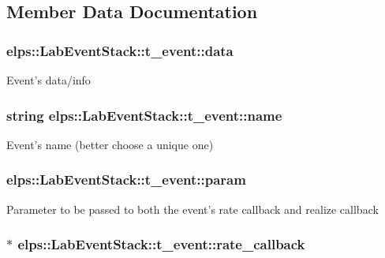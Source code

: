 \subsection{Member Data Documentation}
\hypertarget{structelps_1_1_lab_event_stack_1_1t__event_a1044f494c01f5ea07e218b3e864d7d01}{
\subsubsection[{data}]{ elps\+::\+Lab\+Event\+Stack\+::t\+\_\+event\+::data}}\label{structelps_1_1_lab_event_stack_1_1t__event_a1044f494c01f5ea07e218b3e864d7d01}
Event's data/info \hypertarget{structelps_1_1_lab_event_stack_1_1t__event_a538290fe829f0a5d8b3cea01ce4c26d1}{
\subsubsection[{name}]{\setlength{\rightskip}{0pt plus 5cm}string elps\+::\+Lab\+Event\+Stack\+::t\+\_\+event\+::name}}\label{structelps_1_1_lab_event_stack_1_1t__event_a538290fe829f0a5d8b3cea01ce4c26d1}
Event's name (better choose a unique one) \hypertarget{structelps_1_1_lab_event_stack_1_1t__event_a850614c485c934dde0a12df273c1c393}{
\subsubsection[{param}]{ elps\+::\+Lab\+Event\+Stack\+::t\+\_\+event\+::param}}\label{structelps_1_1_lab_event_stack_1_1t__event_a850614c485c934dde0a12df273c1c393}
Parameter to be passed to both the event's rate callback and realize callback \hypertarget{structelps_1_1_lab_event_stack_1_1t__event_ad697b4f39052f9b55b906733d0a32f64}{
\subsubsection[{rate\+\_\+callback}]{$\ast$ elps\+::\+Lab\+Event\+Stack\+::t\+\_\+event\+::rate\+\_\+callback}}\label{structelps_1_1_lab_event_stack_1_1t__event_ad697b4f39052f9b55b906733d0a32f64}
